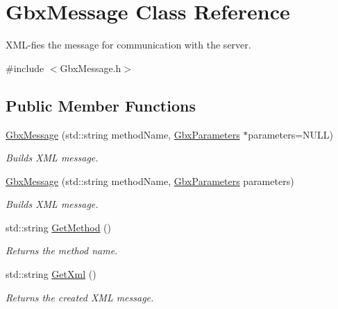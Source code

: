 \hypertarget{classGbxMessage}{\section{Gbx\-Message Class Reference}
\label{classGbxMessage}
}


X\-M\-L-\/fies the message for communication with the server.  




{\ttfamily \#include $<$Gbx\-Message.\-h$>$}

\subsection*{Public Member Functions}
\begin{DoxyCompactItemize}
\item 
\hyperlink{classGbxMessage_aa06aa73544aa343e42a5f19434a05928}{Gbx\-Message} (std\-::string method\-Name, \hyperlink{classGbxParameters}{Gbx\-Parameters} $\ast$parameters=N\-U\-L\-L)
\begin{DoxyCompactList}\small\item\em Builds X\-M\-L message. \end{DoxyCompactList}\item 
\hyperlink{classGbxMessage_a547920253f296bd68432cfb74684e6c7}{Gbx\-Message} (std\-::string method\-Name, \hyperlink{classGbxParameters}{Gbx\-Parameters} parameters)
\begin{DoxyCompactList}\small\item\em Builds X\-M\-L message. \end{DoxyCompactList}\item 
\hypertarget{classGbxMessage_a53e00a162c293251bef476ad74d0134c}{std\-::string \hyperlink{classGbxMessage_a53e00a162c293251bef476ad74d0134c}{Get\-Method} ()}\label{classGbxMessage_a53e00a162c293251bef476ad74d0134c}

\begin{DoxyCompactList}\small\item\em Returns the method name. \end{DoxyCompactList}\item 
\hypertarget{classGbxMessage_ac81e16efce7da483a696d6653e18c9d8}{std\-::string \hyperlink{classGbxMessage_ac81e16efce7da483a696d6653e18c9d8}{Get\-Xml} ()}\label{classGbxMessage_ac81e16efce7da483a696d6653e18c9d8}

\begin{DoxyCompactList}\small\item\em Returns the created X\-M\-L message. \end{DoxyCompactList}\end{DoxyCompactItemize}
